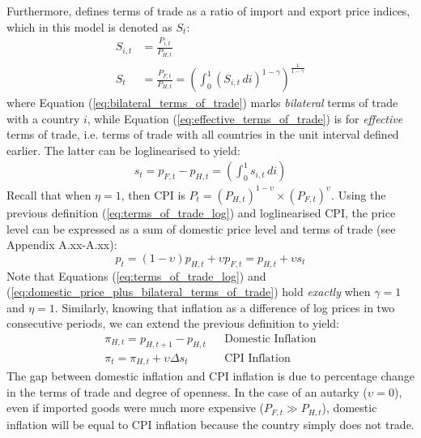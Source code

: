 Furthermore, \textcite{oecd_2022_international} defines terms of trade as a ratio of import and export price indices, which in this model is denoted as $S_t$:
\begin{align}
    S_{i,t} &= \frac{P_{i,t}}{P_{H,t}}                       \label{eq:bilateral_terms_of_trade}                                                                                    \\
    S_{t} &=  \frac{P_{F,t}}{P_{H,t}} = \left(\int_{0}^{1} (S_{i,t} \, di)^{1-\gamma}\right)^{\frac{1}{1-\gamma}}            \label{eq:effective_terms_of_trade}              
\end{align}
where Equation (\ref{eq:bilateral_terms_of_trade}) marks \textit{bilateral} terms of trade with a country $i$, while Equation (\ref{eq:effective_terms_of_trade}) is for \textit{effective} terms of trade, i.e. terms of trade with all countries in the unit interval defined earlier. The latter can be loglinearised to yield:
\begin{align}
    s_t = p_{F,t} - p_{H,t} = \left(\int_{0}^{1} s_{i,t} \, di \right)                                      \label{eq:terms_of_trade_log} 
\end{align}
Recall that when $\eta = 1$, then CPI is $P_t = (P_{H,t})^{1-\upsilon} \times (P_{F,t})^{\upsilon}$. Using the previous definition (\ref{eq:terms_of_trade_log}) and loglinearised CPI, the price level can be expressed as a sum of domestic price level and terms of trade (see Appendix A.xx-A.xx):
\begin{equation}
    p_t = (1-\upsilon)p_{H,t} + \upsilon p_{F,t} = p_{H,t} + \upsilon s_t \label{eq:domestic_price_plus_bilateral_terms_of_trade}
\end{equation}
Note that Equations (\ref{eq:terms_of_trade_log}) and (\ref{eq:domestic_price_plus_bilateral_terms_of_trade}) hold \textit{exactly} when $\gamma=1$ and $\eta = 1$. Similarly, knowing that inflation as a difference of log prices in two consecutive periods, we can extend the previous definition to yield:
\begin{align}
    \pi_{H,t} = p_{H,t+1} - p_{H,t}         &  & \text{Domestic Inflation} \\
    \pi_{t} = \pi_{H,t} + \upsilon \Delta s_t \label{eq:cpi_inflation_tot}&  & \text{CPI Inflation}
\end{align}
The gap between domestic inflation and CPI inflation is due to percentage change in the terms of trade and degree of openness. In the case of an autarky ($\upsilon = 0$), even if imported goods were much more expensive ($P_{F,t} \gg P_{H,t}$), domestic inflation will be equal to CPI inflation because the country simply does not trade.

